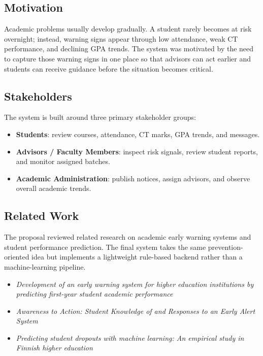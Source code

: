 \documentclass[12pt,a4paper]{article}
\begin{document}
\subsection{Motivation}
Academic problems usually develop gradually. A student rarely becomes at risk overnight; instead, warning signs appear through low attendance, weak CT performance, and declining GPA trends. The system was motivated by the need to capture those warning signs in one place so that advisors can act earlier and students can receive guidance before the situation becomes critical.

\subsection{Stakeholders}
The system is built around three primary stakeholder groups:
\begin{itemize}[leftmargin=*]
  \item \textbf{Students}: review courses, attendance, CT marks, GPA trends, and messages.
  \item \textbf{Advisors / Faculty Members}: inspect risk signals, review student reports, and monitor assigned batches.
  \item \textbf{Academic Administration}: publish notices, assign advisors, and observe overall academic trends.
\end{itemize}

\subsection{Related Work}
The proposal reviewed related research on academic early warning systems and student performance prediction. The final system takes the same prevention-oriented idea but implements a lightweight rule-based backend rather than a machine-learning pipeline.
\begin{itemize}[leftmargin=*]
  \item \textit{Development of an early warning system for higher education institutions by predicting first-year student academic performance}
  \item \textit{Awareness to Action: Student Knowledge of and Responses to an Early Alert System}
  \item \textit{Predicting student dropouts with machine learning: An empirical study in Finnish higher education}
\end{itemize}
\end{document}
